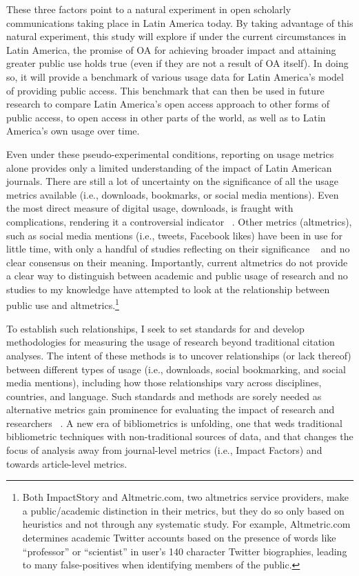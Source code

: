 These three factors point to a natural experiment in open scholarly communications taking place in Latin America today. By taking advantage of this natural experiment, this study will explore if under the current circumstances in Latin America, the promise of OA for achieving broader impact and attaining greater public use holds true (even if they are not a result of OA itself). In doing so, it will provide a benchmark of various usage data for Latin America's model of providing public access. This benchmark that can then be used in future research to compare Latin America's open access approach to other forms of public access, to open access in other parts of the world, as well as to Latin America's own usage over time.

Even under these pseudo-experimental conditions, reporting on usage metrics alone provides only a limited understanding of the impact of Latin American journals. There are still a lot of uncertainty on the significance of all the usage metrics available (i.e., downloads, bookmarks, or social media mentions). Even the most direct measure of digital usage, downloads, is fraught with complications, rendering it a controversial indicator ~\citep{Davis2011}. Other metrics (altmetrics), such as social media mentions (i.e., tweets, Facebook likes) have been in use for little time, with only a handful of studies reflecting on their significance ~\citep[amongst a few others]{Thelwall2013c,Torres-Salinas2013,Costas2014,Haustein2014b} and no clear consensus on their meaning. Importantly, current altmetrics do not provide a clear way to distinguish between academic and public usage of research and no studies to my knowledge have attempted to look at the relationship between public use and altmetrics.\footnote{Both ImpactStory and Altmetric.com, two altmetrics service providers, make a public\slash academic distinction in their metrics, but they do so only based on heuristics and not through any systematic study. For example, Altmetric.com determines academic Twitter accounts based on the presence of words like ``professor'' or ``scientist'' in user's 140 character Twitter biographies, leading to many false-positives when identifying members of the public.}

To establish such relationships, I seek to set standards for and develop methodologies for measuring the usage of research beyond traditional citation analyses. The intent of these methods is to uncover relationships (or lack thereof) between different types of usage (i.e., downloads, social bookmarking, and social media mentions), including how those relationships vary across disciplines, countries, and language. Such standards and methods are sorely needed as alternative metrics gain prominence for evaluating the impact of research and researchers ~\citep{DORA2012}. A new era of bibliometrics is unfolding, one that weds traditional bibliometric techniques with non-traditional sources of data, and that changes the focus of analysis away from journal-level metrics (i.e., Impact Factors) and towards article-level metrics.

